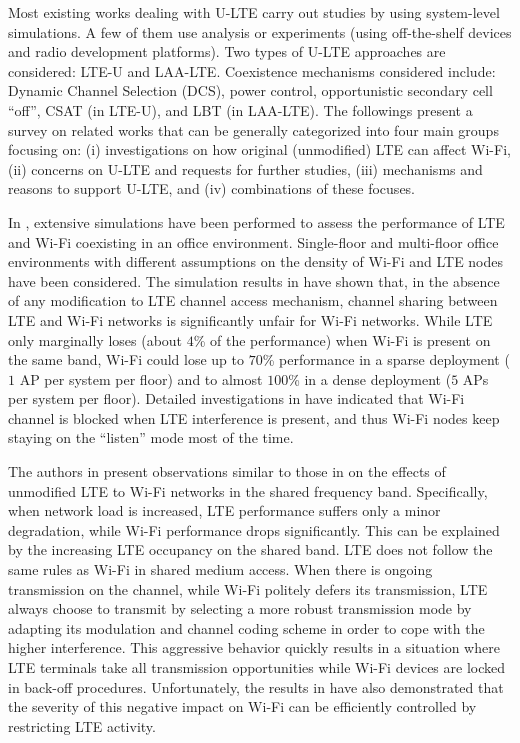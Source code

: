 Most existing works dealing with U-LTE carry out studies by using system-level simulations. A few of them use analysis or experiments (using off-the-shelf devices and radio development platforms). Two types of U-LTE approaches are considered: LTE-U and LAA-LTE. Coexistence mechanisms considered include: Dynamic Channel Selection (DCS), power control, opportunistic secondary cell ``off'', CSAT (in LTE-U), and LBT (in LAA-LTE). The followings present a survey on related works that can be generally categorized into four main groups focusing on: (i) investigations on how original (unmodified) LTE can affect Wi-Fi, (ii) concerns on U-LTE and requests for further studies, (iii) mechanisms and reasons to support U-LTE, and (iv) combinations of these focuses.

In \cite{original-LTE-Wi-Fi-VTC-2013}, extensive simulations have been performed to assess the performance of LTE and Wi-Fi coexisting in an office environment. Single-floor and multi-floor office environments with different assumptions on the density of Wi-Fi and LTE nodes have been considered. The simulation results in \cite{original-LTE-Wi-Fi-VTC-2013} have shown that, in the absence of any modification to LTE channel access mechanism, channel sharing between LTE and Wi-Fi networks is significantly unfair for Wi-Fi networks. While LTE only marginally loses (about $4$\% of the performance) when Wi-Fi is present on the same band, Wi-Fi could lose up to $70$\% performance in a sparse deployment ($1$ AP per system per floor) and to almost $100$\% in a dense deployment ($5$ APs per system per floor). Detailed investigations in \cite{original-LTE-Wi-Fi-VTC-2013} have indicated that Wi-Fi channel is blocked when LTE interference is present, and thus Wi-Fi nodes keep staying on the ``listen'' mode most of the time.

The authors in \cite{original-LTE-Wi-Fi-WCNC-2013} present observations similar to those in \cite{original-LTE-Wi-Fi-VTC-2013} on the effects of unmodified LTE to Wi-Fi networks in the shared frequency band. Specifically, when network load is increased, LTE performance suffers only a minor degradation, while Wi-Fi performance drops significantly. This can be explained by the increasing LTE occupancy on the shared band. LTE does not follow the same rules as Wi-Fi in shared medium access. When there is ongoing transmission on the channel, while Wi-Fi politely defers its transmission, LTE always choose to transmit by selecting a more robust transmission mode by adapting its modulation and channel coding scheme in order to cope with the higher interference. This aggressive behavior quickly results in a situation where LTE terminals take all transmission opportunities while Wi-Fi devices are locked in back-off procedures. Unfortunately, the results in \cite{original-LTE-Wi-Fi-WCNC-2013} have also demonstrated that the severity of this negative impact on Wi-Fi can be efficiently controlled by restricting LTE activity.

